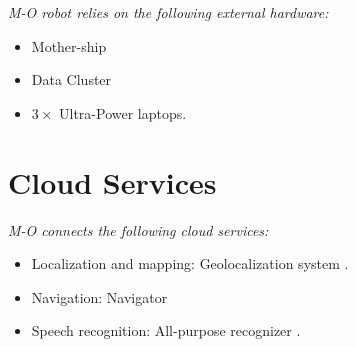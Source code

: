 \textit{M-O robot relies on the following external hardware:}

\begin{itemize}
	\item \BnL Mother-ship
	\item \BnL Data Cluster
	\item $3 \times$ \BnL Ultra-Power laptops.
\end{itemize}

\section*{Cloud Services}

\textit{M-O connects the following cloud services:}
\begin{itemize}
	\item Localization and mapping: \BnL Geolocalization system \cite{bnl3}.
	\item Navigation: \BnL Navigator
	\item Speech recognition: \BnL All-purpose recognizer \cite{bnl1}.
\end{itemize}